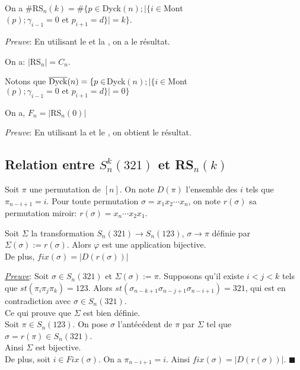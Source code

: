\begin{corollaire}\label{SimNOfK} \text{ }\\
	On a $\#$\rm{RS}$_{n}(k) = \# \{p \in $\rm{Dyck}$(n); |\{i \in $\rm{Mont}$(p); \gamma_{i-1}=0 \text{ et } p_{i+1}=d\}|=k\}$.
\end{corollaire}
\textit{Preuve}: En utilisant le  et la , on a le résultat.

\begin{corollaire}
	On a:  $|$\rm{RS}$_{n}|=C_{n}$.
\end{corollaire}
Notons que $\overline{\rm{Dyck}}(n) = \{p \in $\rm{Dyck}$(n); |\{i \in $\rm{Mont}$(p); \gamma_{i-1}=0 \text{ et } p_{i+1}=d\}|=0\}$

\begin{corollaire} \label{fnToSRn0}
	\begin{rm}
		On a, $F_{n}=|$\rm{RS}$_{n}(0)|$
	\end{rm}
\end{corollaire}
\textit{Preuve}: En utilisant la  et le  , on obtient le résultat.


\subsection{Relation entre $S_{n}^{k}(321)$ et \rm{RS}$_{n}(k)$}
\begin{definition}
	\begin{rm}
		Soit $\pi$ une permutation de $[n]$. On note $D(\pi)$ l'ensemble des $i$ tels que $\pi_{n-i+1}=i$. Pour toute permutation $\sigma=x_{1}x_{2}\cdots x_{n}$, on note $r(\sigma)$ sa permutation miroir: $r(\sigma)=x_{n}\cdots x_{2}x_{1}$.\vspace{10pt}
	\end{rm}
\end{definition}

\begin{proposition} \label{SKNBij}
	Soit $\Sigma$ la transformation $S_{n}(321)\longrightarrow S_{n}(123)$, $\sigma \longrightarrow \pi$ définie par  $\Sigma(\sigma):= r(\sigma)$. Alors $\varphi$ est une application bijective.\\
	De plus, $fix(\sigma)=|D(r(\sigma))|$
\end{proposition}

\underline{\textit{Preuve}}:
Soit $\sigma \in S_{n}(321)$ et $\Sigma(\sigma):=\pi$. Supposons qu'il existe $i<j<k$ tels que $st(\pi_{i}\pi_{j}\pi_{k})=123$. Alors $st(\sigma_{n-k+1}\sigma_{n-j+1}\sigma_{n-i+1})=321$, qui est en contradiction avec $\sigma \in S_{n}(321)$. \\Ce qui prouve que $\Sigma$ est bien définie.\\
Soit $\pi \in S_{n}(123)$. On pose $\sigma$ l'antécédent de $\pi$ par $\Sigma$ tel que $\sigma=r(\pi)\in S_{n}(321)$. \\
Ainsi $\Sigma$ est bijective.\\
De plus, soit $i\in Fix(\sigma)$. On a $\pi_{n-i+1}=i$. Ainsi $fix(\sigma)=|D(r(\sigma))|$. $\blacksquare$

